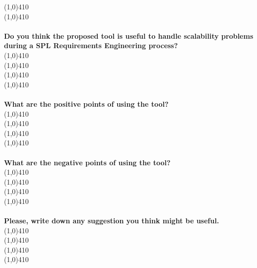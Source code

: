 \line(1,0){410}
\\
\line(1,0){410}
\\
\\
\textbf{Do you think the proposed tool is useful to handle scalability problems during a  SPL Requirements Engineering process?}
\\
\line(1,0){410}
\\
\line(1,0){410}
\\
\line(1,0){410}
\\
\line(1,0){410}
\\
\\
\textbf{What are the positive points of using the tool?}
\\
\line(1,0){410}
\\
\line(1,0){410}
\\
\line(1,0){410}
\\
\line(1,0){410}
\\
\\
\textbf{What are the negative points of using the tool?}
\\
\line(1,0){410}
\\
\line(1,0){410}
\\
\line(1,0){410}
\\
\line(1,0){410}
\\
\\
\textbf{Please, write down any suggestion you think might be useful.}
\\
\line(1,0){410}
\\
\line(1,0){410}
\\
\line(1,0){410}
\\
\line(1,0){410}
\\
